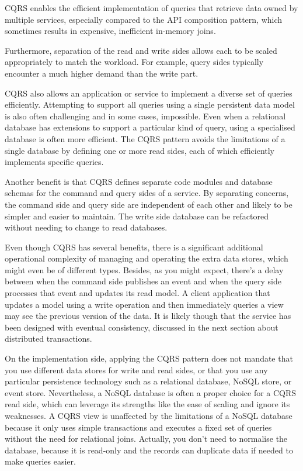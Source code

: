 \documentclass[conference]{IEEEtran}
\begin{document}
CQRS enables the efficient implementation of queries that retrieve data owned by multiple services, especially compared to the API composition pattern, which sometimes results in expensive, inefficient in-memory joins.

Furthermore, separation of the read and write sides allows each to be scaled appropriately to match the workload. For example, query sides typically encounter a much higher demand than the write part.

CQRS also allows an application or service to implement a diverse set of queries efficiently. Attempting to support all queries using a single persistent data model is also often challenging and in some cases, impossible. Even when a relational database has extensions to support a particular kind of query, using a specialised database is often more efficient. The CQRS pattern avoids the limitations of a single database by defining one or more read sides, each of which efficiently implements specific queries.

Another benefit is that CQRS defines separate code modules and database schemas for the command and query sides of a service. By separating concerns, the command side and query side are independent of each other and likely to be simpler and easier to maintain. The write side database can be refactored without needing to change to read databases.

Even though CQRS has several benefits, there is a significant additional operational complexity of managing and operating the extra data stores, which might even be of different types. Besides, as you might expect, there's a delay between when the command side publishes an event and when the query side processes that event and updates its read model. A client application that updates a model using a write operation and then immediately queries a view may see the previous version of the data. It is likely though that the service has been designed with eventual consistency, discussed in the next section about distributed transactions.

On the implementation side, applying the CQRS pattern does not mandate that you use different data stores for write and read sides, or that you use any particular persistence technology such as a relational database, NoSQL store, or event store. Nevertheless, a NoSQL database is often a proper choice for a CQRS read side, which can leverage its strengths like the ease of scaling and ignore its weaknesses. A CQRS view is unaffected by the limitations of a NoSQL database because it only uses simple transactions and executes a fixed set of queries without the need for relational joins. Actually, you don't need to normalise the database, because it is read-only and the records can duplicate data if needed to make queries easier.
\end{document}
